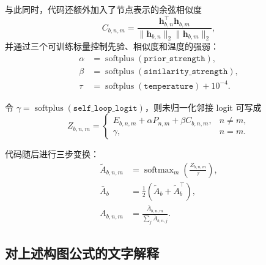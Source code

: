 \documentclass[UTF8]{ctexart}
\begin{document}
与此同时，代码还额外加入了节点表示的余弦相似度
\begin{equation}
    C_{b,n,m} =
    \frac{\bm{h}_{b,n}^{\top}\bm{h}_{b,m}}
    {\|\bm{h}_{b,n}\|_2 \|\bm{h}_{b,m}\|_2},
\end{equation}
并通过三个可训练标量控制先验、相似度和温度的强弱：
\begin{equation}
    \begin{aligned}
        \alpha &= \operatorname{softplus}(\texttt{prior\_strength}), \\
        \beta &= \operatorname{softplus}(\texttt{similarity\_strength}), \\
        \tau &= \operatorname{softplus}(\texttt{temperature}) + 10^{-4}.
    \end{aligned}
\end{equation}

令 \(\gamma = \operatorname{softplus}(\texttt{self\_loop\_logit})\)，则未归一化邻接 logit 可写成
\begin{equation}
    Z_{b,n,m} =
    \begin{cases}
        E_{b,n,m} + \alpha P_{n,m} + \beta C_{b,n,m}, & n \neq m, \\
        \gamma, & n = m.
    \end{cases}
\end{equation}

代码随后进行三步变换：
\begin{align}
    \tilde{A}_{b,n,m} &= \operatorname{softmax}_{m}\!\left(\frac{Z_{b,n,m}}{\tau}\right), \\
    \bar{A}_{b} &= \frac{1}{2}\left(\tilde{A}_{b} + \tilde{A}_{b}^{\top}\right), \\
    A_{b,n,m} &= \frac{\bar{A}_{b,n,m}}{\sum_{j}\bar{A}_{b,n,j}}.
\end{align}

\subsection{对上述构图公式的文字解释}
\end{document}
